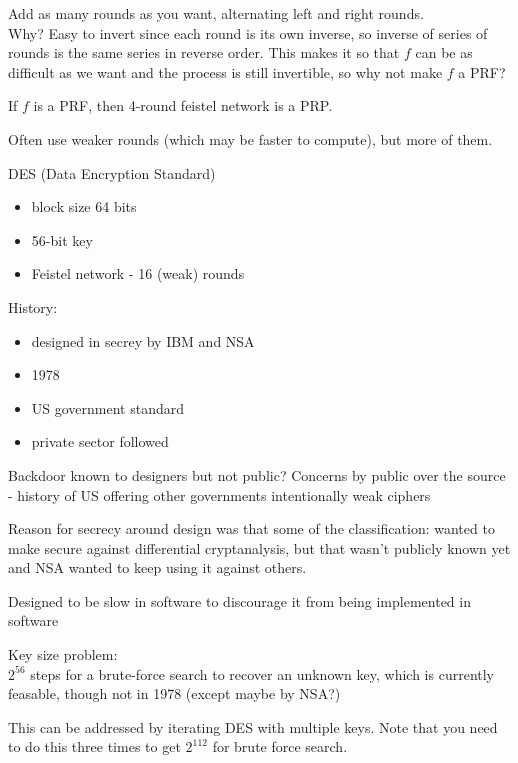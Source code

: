 Add as many rounds as you want, alternating left and right rounds.\\

Why? Easy to invert since each round is its own inverse, so inverse of series
of rounds is the same series in reverse order. This makes it so that $f$ can be
as difficult as we want and the process is still invertible, so why not make $f$
a PRF?\\

\begin{theorem*}
If $f$ is a PRF, then 4-round feistel network is a PRP.
\end{theorem*}
Often use weaker rounds (which may be faster to compute), but more of them.

\begin{example}{DES (Data Encryption Standard)}
    \begin{itemize}
        \item block size 64 bits
        \item 56-bit key
        \item Feistel network - 16 (weak) rounds
    \end{itemize}

    History:
    \begin{itemize}
        \item designed in secrey by IBM and NSA
        \item 1978
        \item US government standard
        \item private sector followed
    \end{itemize}

    Backdoor known to designers but not public? Concerns by public over the
    source - history of US offering other governments intentionally weak ciphers

    Reason for secrecy around design was that some of the classification: wanted
    to make secure against differential cryptanalysis, but that wasn't publicly
    known yet and NSA wanted to keep using it against others.

    Designed to be slow in software to discourage it from being implemented in
    software

    Key size problem:\\
    $2^{56}$ steps for a brute-force search to recover an unknown key, which is
    currently feasable, though not in 1978 (except maybe by NSA?)

    This can be addressed by iterating DES with multiple keys. Note that you
    need to do this three times to get $2^{112}$ for brute force search.
\end{example}


